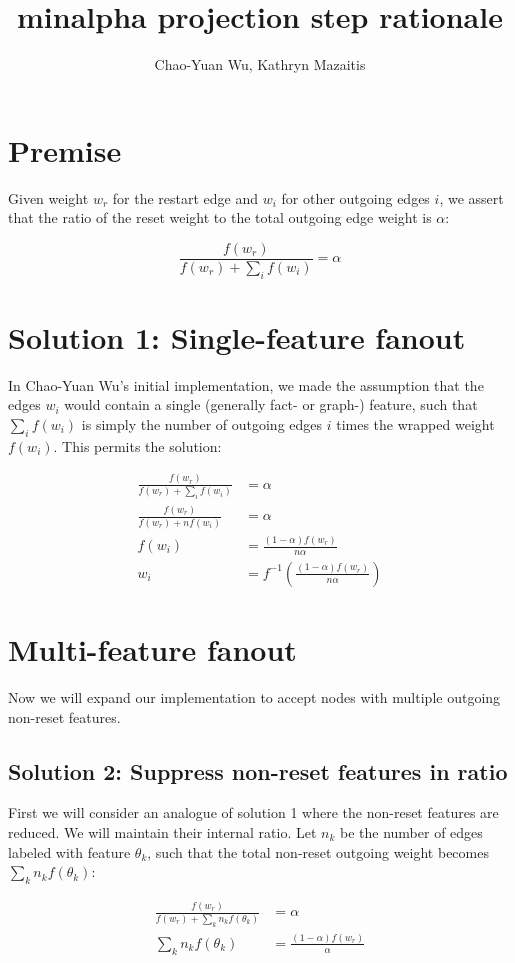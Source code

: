 \documentclass{article}
\title{minalpha projection step rationale}
\author{Chao-Yuan Wu, Kathryn Mazaitis}
\begin{document}
\maketitle

\section*{Premise}
Given weight $w_r$ for the restart edge and $w_i$ for other outgoing edges $i$, we assert that the ratio of the reset weight to the total outgoing edge weight is $\alpha$:

$$\frac{f(w_r)}{f(w_r) + \sum\limits_i f(w_i)} = \alpha$$

\section*{Solution 1: Single-feature fanout}
In Chao-Yuan Wu's initial implementation, we made the assumption that the edges $w_i$ would contain a single (generally fact- or graph-) feature, such that $\sum\limits_i f(w_i)$ is simply the number of outgoing edges $i$ times the wrapped weight $f(w_i)$. This permits the solution:

\begin{align*}
\frac{f(w_r)}{f(w_r) + \sum\limits_i f(w_i)} & =   \alpha\\
\frac{f(w_r)}{f(w_r) + n f(w_i)} & =   \alpha\\
f(w_i) &= \frac{(1-\alpha)f(w_r)}{n \alpha}\\
w_i &= f^{-1}\left(\frac{(1-\alpha)f(w_r)}{n \alpha}\right)
\end{align*}

\section*{Multi-feature fanout}
Now we will expand our implementation to accept nodes with multiple outgoing non-reset features.

\subsection*{Solution 2: Suppress non-reset features in ratio} 
First we will consider an analogue of solution 1 where the non-reset features are reduced. We will maintain their internal ratio. Let $n_k$ be the number of edges labeled with feature $\theta_k$, such that the total non-reset outgoing weight becomes $\sum\limits_k n_kf(\theta_k)$:

\begin{align*}
\frac{f(w_r)}{f(w_r) + \sum\limits_k n_kf(\theta_k)} &= \alpha\\
\sum\limits_k n_kf(\theta_k) &= \frac{(1-\alpha)f(w_r)}{\alpha}
\end{align*}
\end{document}
